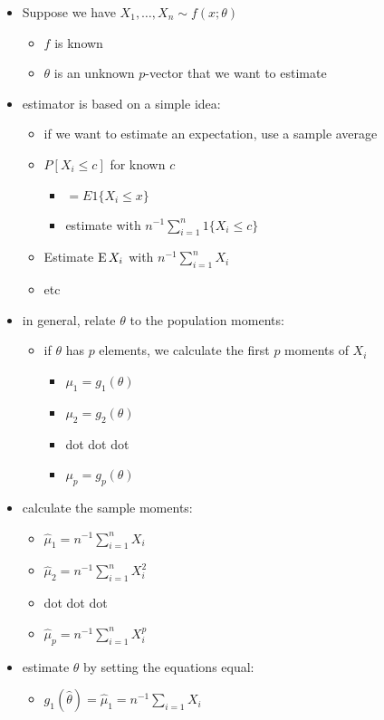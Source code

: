 \begin{itemize}
\item Suppose we have $X_1,\dots,X_n \sim f(x; \theta)$
\begin{itemize}
\item $f$ is known
\item $\theta$ is an unknown $p$-vector that we want to estimate
\end{itemize}
\item estimator is based on a simple idea:
\begin{itemize}
\item if we want to estimate an expectation, use a sample average
\item $P[X_i \leq c]$ for known $c$
\begin{itemize}
\item $=E 1\{X_i \leq x\}$
\item estimate with $n^{-1} \sum_{i=1}^n 1\{X_i \leq c\}$
\end{itemize}
\item Estimate $\operatorname{E} X_i$ with $n^{-1} \sum_{i=1}^n X_i$
\item etc
\end{itemize}
\item in general, relate $\theta$ to the population moments:
\begin{itemize}
\item if $\theta$ has $p$ elements, we calculate the first $p$ moments
        of $X_i$
\begin{itemize}
\item $\mu_1 = g_1(\theta)$
\item $\mu_2 = g_2(\theta)$
\item dot dot dot
\item $\mu_p = g_p(\theta)$
\end{itemize}
\end{itemize}
\item calculate the sample moments:
\begin{itemize}
\item $\hat \mu_1 = n^{-1}\sum_{i=1}^n X_i$
\item $\hat \mu_2 = n^{-1}\sum_{i=1}^n X_i^2$
\item dot dot dot
\item $\hat \mu_p = n^{-1}\sum_{i=1}^n X_i^p$
\end{itemize}
\item estimate $\theta$ by setting the equations equal:
\begin{itemize}
\item $g_1(\hat\theta) = \hat\mu_1 = n^{-1}\sum_{i=1} X_i$

\end{itemize}
\end{itemize}
